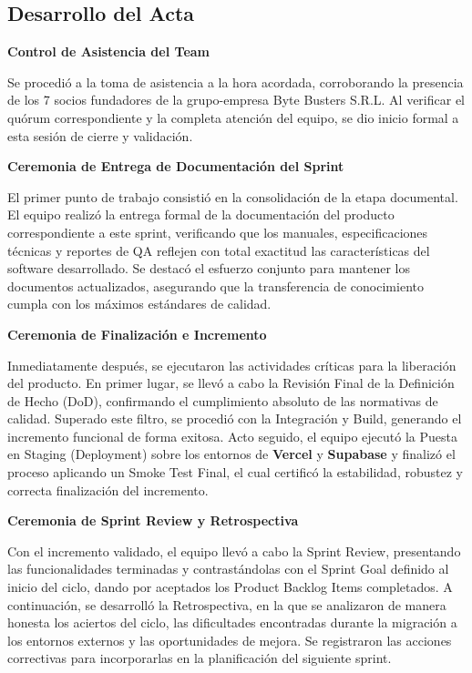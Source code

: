 \newpage
\subsection{Desarrollo del Acta}

\noindent \textbf{Control de Asistencia del Team}\par
Se procedió a la toma de asistencia a la hora acordada, corroborando la presencia de los 7 socios fundadores de la grupo-empresa Byte Busters S.R.L. Al verificar el quórum correspondiente y la completa atención del equipo, se dio inicio formal a esta sesión de cierre y validación.

\vspace*{0.5cm}
\noindent \textbf{Ceremonia de Entrega de Documentación del Sprint}\par
El primer punto de trabajo consistió en la consolidación de la etapa documental. El equipo realizó la entrega formal de la documentación del producto correspondiente a este sprint, verificando que los manuales, especificaciones técnicas y reportes de QA reflejen con total exactitud las características del software desarrollado. Se destacó el esfuerzo conjunto para mantener los documentos actualizados, asegurando que la transferencia de conocimiento cumpla con los máximos estándares de calidad.

\vspace*{0.5cm}
\noindent \textbf{Ceremonia de Finalización e Incremento}\par
Inmediatamente después, se ejecutaron las actividades críticas para la liberación del producto. En primer lugar, se llevó a cabo la Revisión Final de la Definición de Hecho (DoD), confirmando el cumplimiento absoluto de las normativas de calidad. Superado este filtro, se procedió con la Integración y Build, generando el incremento funcional de forma exitosa. Acto seguido, el equipo ejecutó la Puesta en Staging (Deployment) sobre los entornos de \textbf{Vercel} y \textbf{Supabase} y finalizó el proceso aplicando un Smoke Test Final, el cual certificó la estabilidad, robustez y correcta finalización del incremento.

\vspace*{0.5cm}
\noindent \textbf{Ceremonia de Sprint Review y Retrospectiva}\par
Con el incremento validado, el equipo llevó a cabo la Sprint Review, presentando las funcionalidades terminadas y contrastándolas con el Sprint Goal definido al inicio del ciclo, dando por aceptados los Product Backlog Items completados. A continuación, se desarrolló la Retrospectiva, en la que se analizaron de manera honesta los aciertos del ciclo, las dificultades encontradas durante la migración a los entornos externos y las oportunidades de mejora. Se registraron las acciones correctivas para incorporarlas en la planificación del siguiente sprint.

